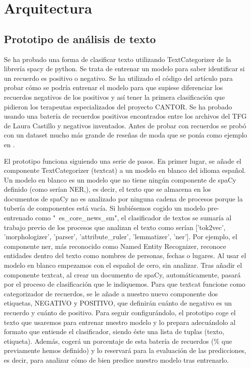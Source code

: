 \chapter{Arquitectura}
\label{cap:arquitectura}

\section{Prototipo de análisis de texto}

Se ha probado una forma de clasificar texto utilizando TextCategorizer \citep{categorizar} de la librería spacy de python. Se trata de entrenar un modelo para saber identificar si un recuerdo es positivo o negativo. Se ha utilizado el código del artículo \cite{prototipo} para probar cómo se podría entrenar el modelo para que supiese diferenciar los recuerdos negativos de los positivos y así tener la primera clasificación que pidieron los terapeutas especializados del proyecto CANTOR. Se ha probado usando una batería de recuerdos positivos encontrados entre los archivos del TFG de Laura Castillo \citep{reminiscencia} y negativos inventados. Antes de probar con recuerdos se probó con un dataset mucho más grande de reseñas de moda que se ponía como ejemplo en \cite{prototipo}. 

El prototipo funciona siguiendo una serie de pasos. En primer lugar, se añade el componente TextCategorizer (textcat) a un modelo en blanco del idioma español. Un modelo en blanco es un modelo que no tiene ningún componente de spaCy definido (como serían NER,), es decir, el texto que se almacena en los documentos de spaCy no es analizado por ninguna cadena de procesos porque la tubería de componentes está vacía. Si hubiésemos cogido un modelo pre-entrenado como "\ es\_core\_news\_sm", el clasificador de textos se sumaría al trabajo previo de los procesos que analizan el texto como serían ['tok2vec', 'morphologizer', 'parser', 'attribute\_ruler', 'lemmatizer', 'ner']. Por ejemplo, el componente ner, más reconocido como Named Entity Recognizer, reconoce entidades dentro del texto como nombres de personas, fechas o lugares. Al usar el modelo en blanco empezamos con el español de cero, sin analizar. Tras añadir el componente textcat, al crear un documento de spaCy, automáticamente, pasará por el proceso de clasificación que le indiquemos. Para que textcat funcione como categorizador de recuerdos, se le añade a nuestro nuevo componente dos etiquetas, NEGATIVO y POSITIVO, que definirán cuánto de negativo es un recuerdo y cuánto de positivo. Para seguir configurándolo, el prototipo coge el texto que usaremos para entrenar nuestro modelo y lo prepara adecuándolo al formato que entiende el clasificador, siendo éste una lista de tuplas (texto, etiqueta). Además, cogerá un porcentaje de esta batería de recuerdos (\% que previamente hemos definido) y lo reservará para la evaluación de las predicciones, es decir, para analizar cómo de bien predice nuestro modelo tras entrenarlo. 


